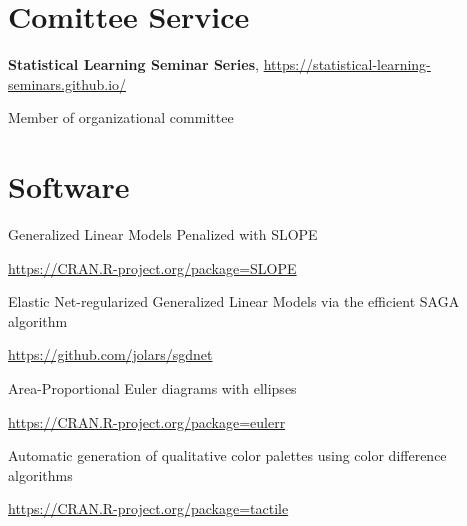 \documentclass[
  10pt,
  headsepline=true,
  english,
  DIV=12
]{scrartcl}
\renewcommand*{%
  \mkbibnamegiven
}[1]{\ifitemannotation{highlight}{\textbf{#1}}{#1}}
\renewcommand*{%
  \mkbibnamefamily
}[1]{\ifitemannotation{highlight}{\textbf{#1}}{#1}}
\begin{document}
\section{Comittee Service}

\begin{description}[
    labelwidth = \widthof{2020} + 1em,
    leftmargin = \widthof{2020} + 1em,
  ]
  \item[2020]{
        \textbf{Statistical Learning Seminar Series},
        \url{https://statistical-learning-seminars.github.io/}

        Member of organizational committee
        }
\end{description}

\section{Software}

\begin{description}[
    labelwidth = \widthof{qualpalr} + 1em,
    leftmargin = \widthof{qualpalr} + 1em,
  ]
  \item[SLOPE] {
        Generalized Linear Models Penalized with SLOPE

        \url{https://CRAN.R-project.org/package=SLOPE}
        }
  \item[sgdnet] {
        Elastic Net-regularized Generalized Linear Models via the efficient
        SAGA algorithm

        \url{https://github.com/jolars/sgdnet}
        }
  \item[eulerr] {
        Area-Proportional Euler diagrams with ellipses

        \url{https://CRAN.R-project.org/package=eulerr}
        }
  \item[qualpalr] {
        Automatic generation of qualitative color palettes using color
        difference algorithms

        \url{https://CRAN.R-project.org/package=tactile}
        }

\end{description}
\end{document}
